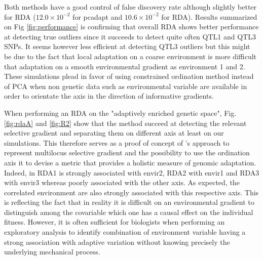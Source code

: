\documentclass[nogrid]{MBE}%
\begin{document}
Both methods have a good control of false discovery rate although slightly better for RDA ($12.0 \times 10^{-2}$ for pcadapt and $10.6 \times 10^{-2}$ for RDA). Results summarized on Fig \ref{fig:performance} is confirming that overall RDA shows better performance at detecting true outliers since it succeeds to detect quite often QTL1 and QTL3 SNPs. It seems however less efficient at detecting QTL3 outliers but this might be due to the fact that local adaptation on a coarse environment is more difficult  that adaptation on a smooth environmental gradient as environment 1 and 2. These simulations plead in favor of using constrained ordination method instead of PCA when non genetic data such as environmental variable are available in order to orientate the axis in the direction of informative gradients.

When performing an RDA on the "adaptively enriched genetic space", Fig. \ref{fig:rdaA} and \ref{fig:R2} show that the method succeed at detecting the relevant selective gradient and separating them on different axis at least on our simulations. This therefore serves as a proof of concept of \citet{Steane2014a}'s approach to represent multilocus selective gradient and the possibility to use the ordination axis it to devise a metric that provides a holistic measure of genomic adaptation. Indeed, in RDA1 is strongly associated with envir2, RDA2 with envir1 and RDA3 with envir3 whereas poorly associated with the other axis. As expected, the correlated environment are also strongly associated with this respective axis. This is reflecting the fact that in reality it is difficult on an environmental gradient to distinguish  among the covariable which one has a causal effect on the individual fitness. However, it is often sufficient for biologists when performing an exploratory analysis to identify combination of environment variable having a strong association with adaptive variation without knowing precisely the underlying mechanical process.
\end{document}
